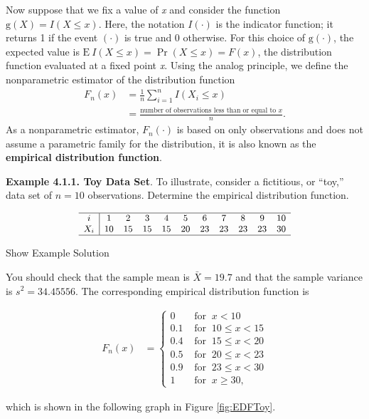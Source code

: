 \documentclass[]{book}
\theoremstyle{definition}
\theoremstyle{definition}
\theoremstyle{definition}
\theoremstyle{remark}
\begin{document}
Now suppose that we fix a value of \emph{x} and consider the function
\(\mathrm{g}(X) = I(X \le x)\). Here, the notation \(I(\cdot)\) is the
indicator function; it returns 1 if the event \((\cdot)\) is true and 0
otherwise. For this choice of \(\mathrm{g}(\cdot)\), the expected value
is \(\mathrm{E~} I(X \le x) = \Pr(X \le x) = F(x)\), the distribution
function evaluated at a fixed point \emph{x}. Using the analog
principle, we define the nonparametric estimator of the distribution
function \[
\begin{aligned}
F_n(x)
&=  \frac{1}{n} \sum_{i=1}^n I\left(X_i \le x\right) \\
&=  \frac{\text{number of observations less than or equal to }x}{n} . 
\end{aligned}
\] As a nonparametric estimator, \(F_n(\cdot)\) is based on only
observations and does not assume a parametric family for the
distribution, it is also known as the \textbf{empirical distribution
function}.

\textbf{Example 4.1.1. Toy Data Set}. To illustrate, consider a
fictitious, or ``toy,'' data set of \(n=10\) observations. Determine the
empirical distribution function.

\[
{\small
\begin{array}{c|cccccccccc}
\hline
i &1&2&3&4&5&6&7&8&9&10 \\
X_i& 10 &15 &15 &15 &20 &23 &23 &23 &23 &30\\
\hline
\end{array}
}
\]

Show Example Solution

\hypertarget{toggleExampleSelect.1.1}{}
You should check that the sample mean is \(\bar{X} = 19.7\) and that the
sample variance is \(s^2 =34.45556\). The corresponding empirical
distribution function is

\[\begin{aligned}
F_n(x) &=
\left\{
\begin{array}{ll}
0 & \text{ for }\ x<10 \\
0.1 & \text{ for }\ 10 \leq x<15 \\
0.4 & \text{ for }\ 15 \leq x<20 \\
0.5 & \text{ for }\ 20 \leq x<23 \\
0.9 & \text{ for }\ 23 \leq x<30 \\
1 & \text{ for }\ x \geq 30,
\end{array}
\right.\end{aligned}\]

which is shown in the following graph in Figure \ref{fig:EDFToy}.
\end{document}
